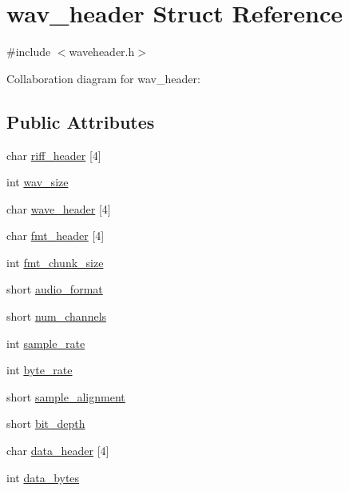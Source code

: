 \hypertarget{structwav__header}{}\section{wav\+\_\+header Struct Reference}
\label{structwav__header}


{\ttfamily \#include $<$waveheader.\+h$>$}



Collaboration diagram for wav\+\_\+header\+:
\subsection*{Public Attributes}
\begin{DoxyCompactItemize}
\item 
char \hyperlink{structwav__header_a977b8193bf1f39dbd815c6210f0bb6c6}{riff\+\_\+header} \mbox{[}4\mbox{]}
\item 
int \hyperlink{structwav__header_a89a86a26a94e726411e34517bfc9105e}{wav\+\_\+size}
\item 
char \hyperlink{structwav__header_a0dc0cff34ad7fe5e59c5cbcee1640354}{wave\+\_\+header} \mbox{[}4\mbox{]}
\item 
char \hyperlink{structwav__header_a4039d1e8e91d7940aa45a29aad27b4ce}{fmt\+\_\+header} \mbox{[}4\mbox{]}
\item 
int \hyperlink{structwav__header_a5fb4363d52bbff51ca2e8884408208c6}{fmt\+\_\+chunk\+\_\+size}
\item 
short \hyperlink{structwav__header_a94c9ee0387f846c47eb9e97636994d93}{audio\+\_\+format}
\item 
short \hyperlink{structwav__header_a625d84de0f598e50c072d725f6e3b6b8}{num\+\_\+channels}
\item 
int \hyperlink{structwav__header_a0632019c676aa88f0351c0ab11461de0}{sample\+\_\+rate}
\item 
int \hyperlink{structwav__header_a8330740d45200d6aee4ba54fc0d834d8}{byte\+\_\+rate}
\item 
short \hyperlink{structwav__header_a2672b73c81973008677db6349fbc232a}{sample\+\_\+alignment}
\item 
short \hyperlink{structwav__header_a63fa60069060bae97c8a64c5b37afa23}{bit\+\_\+depth}
\item 
char \hyperlink{structwav__header_ae43fac12459053e98a80e3879c5cd2a7}{data\+\_\+header} \mbox{[}4\mbox{]}
\item 
int \hyperlink{structwav__header_a3eeeca270947eab7c7aaee61bbee9b0e}{data\+\_\+bytes}
\end{DoxyCompactItemize}


